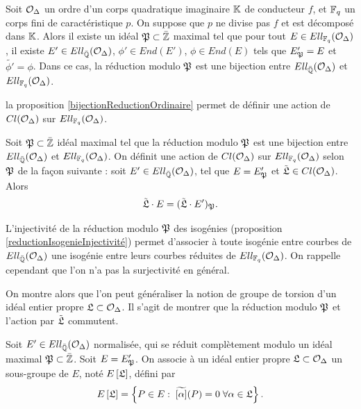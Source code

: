 \begin{Prop}\label{bijectionReductionOrdinaire}
	
	Soit $\mathcal{O}_{\Delta}$ un ordre d'un corps quadratique imaginaire $\mathbb{K}$ de conducteur $f$, et $\mathbb{F}_{q}$ un corps fini de caractéristique $p$. On suppose que $p$ ne divise pas $f$ et est décomposé dans $\mathbb{K}$. Alors il existe un idéal $\mathfrak{P}\subset\bar{\mathbb{Z}}$ maximal tel que pour tout $E\in Ell_{\mathbb{F}_{q}}(\mathcal{O}_{\Delta})$, il existe $E'\in Ell_{\bar{\mathbb{Q}}}(\mathcal{O}_{\Delta})$, $\phi'\in End(E')$, $\phi\in End(E)$ tels que $E'_{\mathfrak{P}} = E$ et $\tilde{\phi'} = \phi$. Dans ce cas, la réduction modulo $\mathfrak{P}$ est une bijection entre $Ell_{\bar{\mathbb{Q}}}(\mathcal{O}_{\Delta})$ et $Ell_{\mathbb{F}_{q}}(\mathcal{O}_{\Delta})$.
\end{Prop}

la proposition \ref{bijectionReductionOrdinaire} permet de définir une action de $Cl(\mathcal{O}_{\Delta})$ sur $Ell_{\mathbb{F}_{q}}(\mathcal{O}_{\Delta})$.

\begin{Def}
	Soit $\mathfrak{P}\subset\bar{\mathbb{Z}}$ idéal maximal tel que la réduction modulo $\mathfrak{P}$ est une bijection entre $Ell_{\bar{\mathbb{Q}}}(\mathcal{O}_{\Delta})$ et $Ell_{\mathbb{F}_{q}}(\mathcal{O}_{\Delta})$. On définit une action de $Cl(\mathcal{O}_{\Delta})$ sur $Ell_{\mathbb{F}_{q}}(\mathcal{O}_{\Delta})$ selon $\mathfrak{P}$ de la façon suivante : soit $E'\in Ell_{\bar{\mathbb{Q}}}(\mathcal{O}_{\Delta})$, tel que $E = E'_{\mathfrak{P}}$ et $\tilde{\mathfrak{L}}\in Cl(\mathcal{O}_{\Delta})$. Alors
	\begin{equation*}
		\tilde{\mathfrak{L}}\cdot E = (\tilde{\mathfrak{L}}\cdot E')_{\mathfrak{P}}.
	\end{equation*}
	 
\end{Def}

\begin{Rem}
	 L'injectivité de la réduction modulo $\mathfrak{P}$ des isogénies (proposition \ref{reductionIsogenieInjectivité}) permet d'associer à toute isogénie entre courbes de $Ell_{\bar{\mathbb{Q}}}(\mathcal{O}_{\Delta})$ une isogénie entre leurs courbes réduites de $Ell_{\mathbb{F}_{q}}(\mathcal{O}_{\Delta})$. On rappelle cependant que l'on n'a pas la surjectivité en général.
\end{Rem}

On montre alors que l'on peut généraliser la notion de groupe de torsion d'un idéal entier propre $\mathfrak{L}\subset\mathcal{O}_{\Delta}$. Il s'agit de montrer que la réduction modulo $\mathfrak{P}$ et l'action par $\tilde{\mathfrak{L}}$ commutent. 

\begin{Def}
	Soit $E'\in Ell_{\bar{\mathbb{Q}}}(\mathcal{O}_{\Delta})$ normalisée, qui se réduit complètement modulo un idéal maximal $\mathfrak{P}\subset\bar{\mathbb{Z}}$. Soit $E = E'_{\mathfrak{P}}$. On associe à un idéal entier propre $\mathfrak{L}\subset\mathcal{O}_{\Delta}$ un sous-groupe de $E$, noté $E\left[ \mathfrak{L}\right]$, défini par
	\begin{equation*}
		E\left[ \mathfrak{L}\right] = \left\lbrace P\in E :\; \widetilde{\left[ \alpha\right] }(P) = 0 \;\forall\alpha\in\mathfrak{L}\right\rbrace .
	\end{equation*} 
	
\end{Def}

